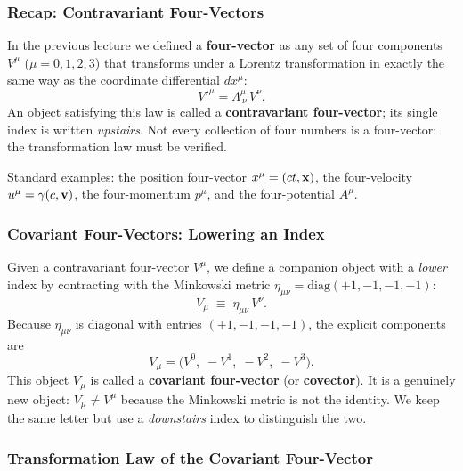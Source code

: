 \subsubsection*{Recap: Contravariant Four-Vectors}

In the previous lecture we defined a \textbf{four-vector} as any set of four
components $V^\mu$ ($\mu = 0,1,2,3$) that transforms under a Lorentz
transformation in exactly the same way as the coordinate differential
$dx^\mu$:
\begin{equation}\label{eq:lec06:contravariant-transform}
    V'^\mu = \Lambda^\mu_{\ \nu}\,V^\nu .
\end{equation}
An object satisfying this law is called a \textbf{contravariant four-vector};
its single index is written \emph{upstairs}.  Not every collection of four
numbers is a four-vector: the transformation law must be verified.

Standard examples: the position four-vector $x^\mu = (ct,\mathbf{x})$, the
four-velocity $u^\mu = \gamma(c,\mathbf{v})$, the four-momentum $p^\mu$, and
the four-potential $A^\mu$.

\subsubsection*{Covariant Four-Vectors: Lowering an Index}

Given a contravariant four-vector $V^\mu$, we define a companion object with
a \emph{lower} index by contracting with the Minkowski metric
$\eta_{\mu\nu} = \mathrm{diag}(+1,-1,-1,-1)$:
\begin{equation}\label{eq:lec06:covariant-def}
    V_\mu \;\equiv\; \eta_{\mu\nu}\,V^\nu .
\end{equation}
Because $\eta_{\mu\nu}$ is diagonal with entries $(+1,-1,-1,-1)$, the
explicit components are
\begin{equation}\label{eq:lec06:covariant-components}
    V_\mu = \bigl(V^0,\;-V^1,\;-V^2,\;-V^3\bigr).
\end{equation}
This object $V_\mu$ is called a \textbf{covariant four-vector} (or
\textbf{covector}).  It is a genuinely new object: $V_\mu \neq V^\mu$ because
the Minkowski metric is not the identity.  We keep the same letter but use a
\emph{downstairs} index to distinguish the two.

\subsubsection*{Transformation Law of the Covariant Four-Vector}

